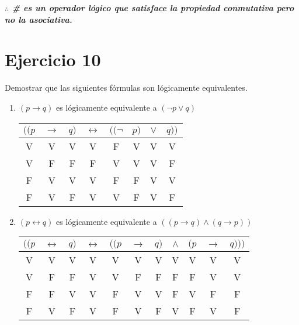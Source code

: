 \documentclass[osajnl,twocolumn,showpacs,superscriptaddress,10pt]{revtex4-1} %
\begin{document}
\textbf{\textit{$\therefore$ \# es un operador lógico que satisface la propiedad conmutativa pero no la asociativa.}} \\

\section{Ejercicio 10}

Demostrar que las siguientes fórmulas son lógicamente equivalentes. \\

\begin{enumerate}[i-]
  \item $(p \rightarrow q)$ es lógicamente equivalente a $(\neg p \vee q)$ \\
  
  \begin{table}[h!]
    \setlength{\tabcolsep}{1.0em}
    \centering
    \begin{tabular}{ccc|c|cccc}
      $((p$ & $\rightarrow$ & $q)$ & $\leftrightarrow$ & $((\neg$ & $p)$ & $\vee$ & $q))$ \\
      \hline
      V & V & V & V & F & V & V & V \\
      V & F & F & F & V & V & V & F \\
      F & V & V & V & F & F & V & V \\
      F & V & F & V & V & F & V & F
    \end{tabular}
  \end{table}
  
  \item $(p \leftrightarrow q)$ es lógicamente equivalente a $((p \rightarrow q) \wedge (q \rightarrow p))$ \\
  
  \begin{table}[h!]
    \setlength{\tabcolsep}{1.0em}
    \centering
    \begin{tabular}{ccc|c|ccccccc}
      $((p$ & $\leftrightarrow$ & $q)$ & $\leftrightarrow$ & $((p$ & $\rightarrow$ & $q)$ & $\wedge$ & $(p$ & $\rightarrow$ & $q)))$ \\
      \hline
      V & V & V & V & V & V & V & V & V & V & V \\
      V & F & F & V & V & F & F & F & F & V & V \\
      F & F & V & V & F & V & V & F & V & F & F \\
      F & V & F & V & F & V & F & V & F & V & F
    \end{tabular}
  \end{table}
  

\end{enumerate}
\end{document}
